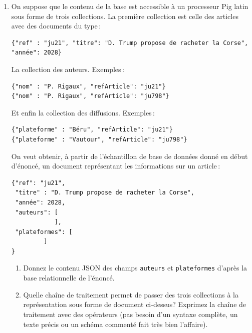 \documentclass[11pt,a4paper]{article}
\begin{document}
\begin{enumerate}
  \item On suppose que le contenu de la base  est accessible à un processeur
    Pig latin sous forme de trois collections. La première collection est celle
    des articles avec des documents du type\,:
    \begin{small}
     \begin{verbatim}
{"ref" : "ju21", "titre": "D. Trump propose de racheter la Corse", "année": 2028}
    \end{verbatim}
    \end{small}
    La collection des auteurs. Exemples\,:
    \begin{small}
        \begin{verbatim}
{"nom" : "P. Rigaux", "refArticle": "ju21"}
{"nom" : "P. Rigaux", "refArticle": "ju798"}
    \end{verbatim}
    \end{small}
    Et enfin la collection des diffusions. Exemples\,:
    \begin{small}
     \begin{verbatim}
{"plateforme" : "Béru", "refArticle": "ju21"}
{"plateforme" : "Vautour", "refArticle": "ju798"}
    \end{verbatim}
    \end{small}
     
    On veut obtenir, à partir 
    de l'échantillon de base de données donné en début d'énoncé, un document
    représentant les informations sur un article\,:

    
    \begin{small}
    \begin{verbatim}
{"ref": "ju21",
 "titre" : "D. Trump propose de racheter la Corse",
 "année": 2028,
 "auteurs": [
            ],
 "plateformes": [
         ]
}
    \end{verbatim}
    \end{small}
    
    
    \begin{enumerate}
      \item Donnez le contenu JSON des champs \texttt{auteurs} et \texttt{plateformes}
          d'après la base relationnelle de l'énoncé.
          
     \item Quelle chaîne de traitement permet de passer des trois collections
         à la représentation sous forme de document ci-dessus? Exprimez 
         la chaîne de traitement avec des opérateurs (pas besoin d'un syntaxe complète,
         un texte précis ou un schéma commenté
         fait très bien l'affaire).
      

\end{enumerate}
\end{enumerate}
\end{document}
